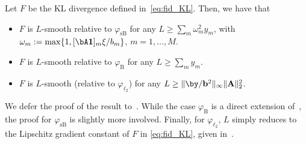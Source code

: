 \documentclass[11pt]{amsart}
\begin{document}
\begin{proposition}
\label{prop:rel_smooth_KL}
Let $F$ be the KL divergence  defined in~\cref{eq:fid_KL}. Then, we have that
\begin{itemize}
\item $F$ is $L$-smooth relative to $\varphi_{\mathrm{sB}}$ for any $L\geq\sum_m \omega_m^2 y_m$, with $\omega_m:=\max\{1,[\bA\boldsymbol{1}]_m \xi/b_m\}$, $m=1,\ldots, M$.
\item $F$ is $L$-smooth relative to $\varphi_\mathrm{B}$ for any $L\geq \sum_m y_m$.
\item $F$ is $L$-smooth (relative to $\varphi_{\ell_2}$) for any $L\geq \|\by/\mathbf{b}^2\|_\infty \|\mathbf{A}\|_2^2$.
\end{itemize}
\end{proposition}
We defer the proof of the result to~. While the case $\varphi_{\mathrm{B}}$ is a direct extension of~\cite[Lemma 7]{bauschke2017descent}, the proof for $\varphi_{\mathrm{sB}}$ is slightly more involved. Finally, for $\varphi_{\ell_2}$, $L$ simply reduces to the Lipschitz gradient constant of $F$ in \eqref{eq:fid_KL}, given in~\cite[Lemma 1]{harmany2011spiral}.
\end{document}
